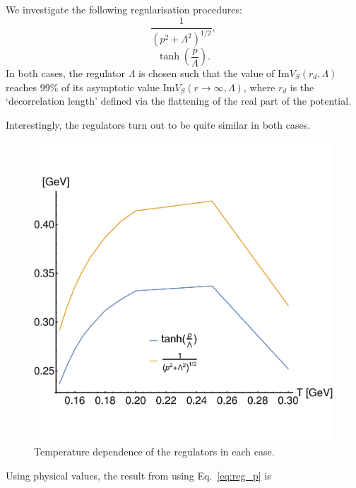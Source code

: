 \documentclass[12pt,a4paper]{article}
\newcommand{\brac}[1] {\!\left(#1\right)}
\begin{document}
We investigate the following regularisation procedures:
\begin{equation}
\label{eq:reg_p}
\frac{1}{\brac{p^2+\Lambda^2}^{1/2}},
\end{equation}
\begin{equation}
\label{eq:reg_tanh}
\tanh\brac{\frac{p}{\Lambda}}.
\end{equation}
In both cases, the regulator \(\Lambda\) is chosen such that the value of \(\mathrm{Im}V_S\brac{r_d,\Lambda}\) reaches 99\% of its asymptotic value \(\mathrm{Im}V_S\brac{r\to\infty,\Lambda}\), where \(r_d\) is the `decorrelation length' defined via the flattening of the real part of the potential. 

Interestingly, the regulators turn out to be quite similar in both cases.
\begin{figure}[H]
	\centering
	\includegraphics[width=\textwidth]{regulators} 
	\caption{Temperature dependence of the regulators in each case.}    	
	\label{fig:reg}
\end{figure}
\clearpage
Using physical values, the result from using Eq.~\eqref{eq:reg_p} is
\end{document}

